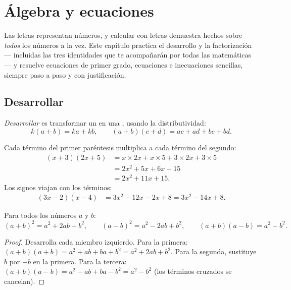 \chapter{Álgebra y ecuaciones}\label{ch:g9:algebra}

Las letras representan números, y calcular con letras demuestra hechos sobre
\emph{todos} los números a la vez. Este capítulo practica el desarrollo y la
factorización --- incluidas las tres identidades que te acompañarán por
todas las matemáticas --- y resuelve ecuaciones de primer grado, ecuaciones
 e inecuaciones sencillas, siempre paso a paso y con justificación.

\section{Desarrollar}

\begin{definition}[Desarrollar]\label{def:g9:algebra:expand}
\emph{Desarrollar} es transformar un  en una
, usando la distributividad:
\[
k(a + b) = ka + kb,
\qquad
(a + b)(c + d) = ac + ad + bc + bd .
\]
\end{definition}

\begin{example}\label{ex:g9:algebra:expand}
Cada término del primer paréntesis multiplica a cada término del segundo:
\begin{align*}
(x + 3)(2x + 5)
&= x \times 2x + x \times 5 + 3 \times 2x + 3 \times 5 \\
&= 2x^2 + 5x + 6x + 15 \\
&= 2x^2 + 11x + 15 .
\end{align*}
Los signos viajan con los términos:
\begin{align*}
(3x - 2)(x - 4)
&= 3x^2 - 12x - 2x + 8
= 3x^2 - 14x + 8 .
\end{align*}
\end{example}

\begin{theorem}\label{thm:g9:algebra:identities}
Para todos los números $a$ y $b$:
\[
(a+b)^2 = a^2 + 2ab + b^2,
\qquad
(a-b)^2 = a^2 - 2ab + b^2,
\qquad
(a+b)(a-b) = a^2 - b^2 .
\]
\end{theorem}

\begin{proof}
Desarrolla cada miembro izquierdo. Para la primera:
$(a+b)(a+b) = a^2 + ab + ba + b^2 = a^2 + 2ab + b^2$. Para la segunda,
sustituye $b$ por $-b$ en la primera. Para la tercera:
$(a+b)(a-b) = a^2 - ab + ba - b^2 = a^2 - b^2$ (los términos cruzados se cancelan).
\end{proof}

